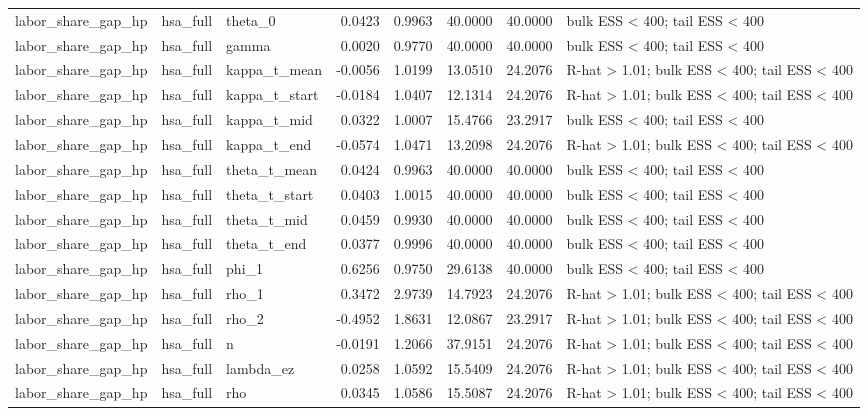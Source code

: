 \begin{tabular}{lllrrrrl}
labor\_share\_gap\_hp & hsa\_full & theta\_0 & 0.0423 & 0.9963 & 40.0000 & 40.0000 & bulk ESS < 400; tail ESS < 400 \\
labor\_share\_gap\_hp & hsa\_full & gamma & 0.0020 & 0.9770 & 40.0000 & 40.0000 & bulk ESS < 400; tail ESS < 400 \\
labor\_share\_gap\_hp & hsa\_full & kappa\_t\_mean & -0.0056 & 1.0199 & 13.0510 & 24.2076 & R-hat > 1.01; bulk ESS < 400; tail ESS < 400 \\
labor\_share\_gap\_hp & hsa\_full & kappa\_t\_start & -0.0184 & 1.0407 & 12.1314 & 24.2076 & R-hat > 1.01; bulk ESS < 400; tail ESS < 400 \\
labor\_share\_gap\_hp & hsa\_full & kappa\_t\_mid & 0.0322 & 1.0007 & 15.4766 & 23.2917 & bulk ESS < 400; tail ESS < 400 \\
labor\_share\_gap\_hp & hsa\_full & kappa\_t\_end & -0.0574 & 1.0471 & 13.2098 & 24.2076 & R-hat > 1.01; bulk ESS < 400; tail ESS < 400 \\
labor\_share\_gap\_hp & hsa\_full & theta\_t\_mean & 0.0424 & 0.9963 & 40.0000 & 40.0000 & bulk ESS < 400; tail ESS < 400 \\
labor\_share\_gap\_hp & hsa\_full & theta\_t\_start & 0.0403 & 1.0015 & 40.0000 & 40.0000 & bulk ESS < 400; tail ESS < 400 \\
labor\_share\_gap\_hp & hsa\_full & theta\_t\_mid & 0.0459 & 0.9930 & 40.0000 & 40.0000 & bulk ESS < 400; tail ESS < 400 \\
labor\_share\_gap\_hp & hsa\_full & theta\_t\_end & 0.0377 & 0.9996 & 40.0000 & 40.0000 & bulk ESS < 400; tail ESS < 400 \\
labor\_share\_gap\_hp & hsa\_full & phi\_1 & 0.6256 & 0.9750 & 29.6138 & 40.0000 & bulk ESS < 400; tail ESS < 400 \\
labor\_share\_gap\_hp & hsa\_full & rho\_1 & 0.3472 & 2.9739 & 14.7923 & 24.2076 & R-hat > 1.01; bulk ESS < 400; tail ESS < 400 \\
labor\_share\_gap\_hp & hsa\_full & rho\_2 & -0.4952 & 1.8631 & 12.0867 & 23.2917 & R-hat > 1.01; bulk ESS < 400; tail ESS < 400 \\
labor\_share\_gap\_hp & hsa\_full & n & -0.0191 & 1.2066 & 37.9151 & 24.2076 & R-hat > 1.01; bulk ESS < 400; tail ESS < 400 \\
labor\_share\_gap\_hp & hsa\_full & lambda\_ez & 0.0258 & 1.0592 & 15.5409 & 24.2076 & R-hat > 1.01; bulk ESS < 400; tail ESS < 400 \\
labor\_share\_gap\_hp & hsa\_full & rho & 0.0345 & 1.0586 & 15.5087 & 24.2076 & R-hat > 1.01; bulk ESS < 400; tail ESS < 400 \\

\end{tabular}
